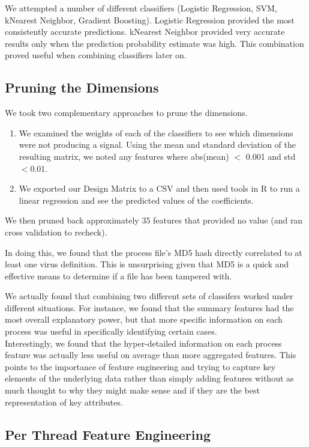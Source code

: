 \documentclass[11pt, oneside]{article}   	%
\begin{document}
We attempted a number of different classifiers (Logistic Regression, SVM, kNearest Neighbor, Gradient Boosting). Logistic Regression provided the most consistently accurate predictions. kNearest Neighbor provided very accurate results only when the prediction probability estimate was high. This combination proved useful when combining classifiers later on.

\subsection*{Pruning the Dimensions}

We took two complementary approaches to prune the dimensions.
\begin{enumerate}
  \item We examined the weights of each of the classifiers to see which dimensions were not producing a signal. Using the mean and standard deviation of the resulting matrix, we noted any features where abs(mean) $<$ 0.001 and std $< $0.01.
  \item We exported our Design Matrix to a CSV and then used tools in R to run a linear regression and see the predicted values of the coefficients. 
\end{enumerate}

We then pruned back approximately 35 features that provided no value (and ran cross validation to recheck).

In doing this, we found that the process file's MD5 hash directly correlated to at least one virus definition. This is unsurprising given that MD5 is a quick and effective means to determine if a file has been tampered with.

We actually found that combining two different sets of classifers worked under different situations. For instance, we found that the summary features had the most overall explanatory power, but that more specific information on each process was useful in specifically identifying certain cases.
\
\\
Interestingly, we found that the hyper-detailed information on each process feature was actually less useful on average than more aggregated features. This points to the importance of feature engineering and trying to capture key elements of the underlying data rather than simply adding features without as much thought to why they might make sense and if they are the best representation of key attributes.
\

\subsection*{Per Thread Feature Engineering}
\end{document}
